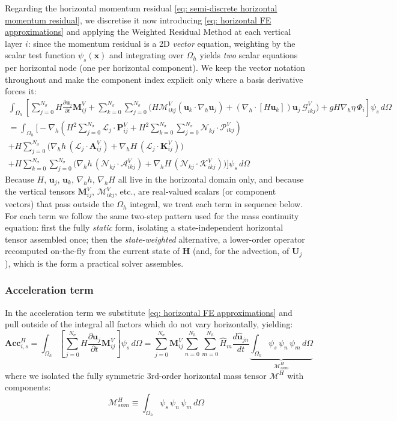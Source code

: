 \documentclass{article}
\newcommand{\Ns}{N_\sigma}
\newcommand{\uj}{\mathbf{u}_j}
\newcommand{\uk}{\mathbf{u}_k}
\newcommand{\sumj}{\sum_{j=0}^{\Ns}}
\newcommand{\sumk}{\sum_{k=0}^{\Ns}}
\newcommand{\nablah}{\nabla_h}
\newcommand{\ddt}[1]{\frac{\partial #1}{\partial t}}
\newcommand{\VMij}{\mathbf{M}_{ij}^V}
\newcommand{\VAij}{\mathbf{A}_{ij}^V}
\newcommand{\VKij}{\mathbf{K}_{ij}^V}
\newcommand{\VMikj}{\boldsymbol{\mathcal{M}}_{ikj}^V}
\newcommand{\VGikj}{\boldsymbol{\mathcal{G}}_{ikj}^V}
\newcommand{\VAikj}{\boldsymbol{\mathcal{A}}_{ikj}^V}
\newcommand{\VKikj}{\boldsymbol{\mathcal{K}}_{ikj}^V}
\newcommand{\VPij}{\mathbf{P}_{ij}^V}
\newcommand{\VPikj}{\boldsymbol{\mathcal{P}}_{ikj}^V}
\newcommand{\Nh}{N_h}
\newcommand{\sumNhn}{\sum_{n=0}^{\Nh}}
\newcommand{\sumNhm}{\sum_{m=0}^{\Nh}}
\newcommand{\uhjn}{\hat{\mathbf{u}}_{jn}}
\newcommand{\Hm}{\hat{H}_m}
\newcommand{\HMsnm}{\boldsymbol{\mathcal{M}}_{snm}^H}
\newcommand{\HtM}{\boldsymbol{\mathcal{M}}^H}
\newcommand{\Uj}{\mathbf{U}_j}
\newcommand{\Hvec}{\mathbf{H}}
\begin{document}
Regarding the horizontal momentum residual \eqref{eq: semi-discrete horizontal momentum residual}, we discretise it now introducing \eqref{eq: horizontal FE approximations} and applying the Weighted Residual Method at each vertical layer $i$: since the momentum residual is a 2D \emph{vector} equation, weighting by the scalar test function $\psi_s(\mathbf{x})$ and integrating over $\Omega_h$ yields \emph{two} scalar equations per horizontal node (one per horizontal component). We keep the vector notation throughout and make the component index explicit only where a basis derivative forces it:
\begin{multline}
    \int_{\Omega_h}\left[\sumj H\ddt{\uj}\VMij
    + \sumk\sumj\Big(H\VMikj(\uk\cdot\nablah\uj) + (\nablah\cdot[H\uk])\uj\,\VGikj\Big)
    + gH\nablah\eta\,\Phi_i\right]\psi_s\,d\Omega \\
    = \int_{\Omega_h}\Bigg[ -\nablah\left( H^2 \sumj \mathcal{L}_j\cdot\VPij + H^2 \sumk\sumj \mathcal{N}_{kj}\cdot\VPikj \right) \\
    + H\sumj\Big(\nablah h\,(\mathcal{L}_j\cdot\VAij)
      + \nablah H\,(\mathcal{L}_j\cdot\VKij)\Big) \\
    + H\sumk\sumj\Big(\nablah h\,(\mathcal{N}_{kj}\cdot\VAikj)
      + \nablah H\,(\mathcal{N}_{kj}\cdot\VKikj)\Big)\Bigg]\psi_s\,d\Omega
    \label{eq: horizontal WRM momentum}
\end{multline}
Because $H$, $\uj$, $\uk$, $\nablah h$, $\nablah H$ all live in the horizontal domain only, and because the vertical tensors $\VMij$, $\VMikj$, etc., are real-valued scalars (or component vectors) that pass outside the $\Omega_h$ integral, we treat each term in sequence below. For each term we follow the same two-step pattern used for the mass continuity equation: first the fully \emph{static} form, isolating a state-independent horizontal tensor assembled once; then the \emph{state-weighted} alternative, a lower-order operator recomputed on-the-fly from the current state of $\Hvec$ (and, for the advection, of $\Uj$), which is the form a practical solver assembles.

\subsubsection*{Acceleration term}

In the acceleration term we substitute \eqref{eq: horizontal FE approximations} and pull outside of the integral all factors which do not vary horizontally, yielding:
\begin{equation}
    \mathbf{Acc}_{i,s}^H = \int_{\Omega_h} \left[\sumj H\ddt{\uj}\VMij\right]\psi_s\,d\Omega
    = \sumj \VMij \sumNhn\sumNhm \Hm\frac{d\uhjn}{dt} \underbrace{\int_{\Omega_h}\psi_s \,\psi_n\,\psi_m\,d\Omega}_{\HMsnm}
    \label{eq: discrete acceleration}
\end{equation}
where we isolated the fully symmetric 3rd-order horizontal mass tensor $\HtM$ with components:
\begin{equation}
    \boxed{\HMsnm \equiv \int_{\Omega_h}\psi_s\,\psi_n\,\psi_m\,d\Omega}
    \label{eq: def horizontal mass 3rd order}
\end{equation}
\end{document}
